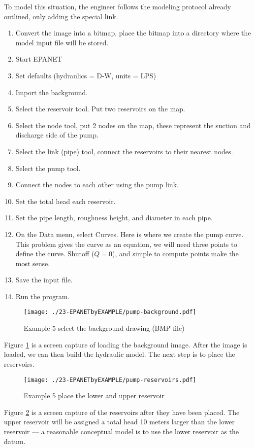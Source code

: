 To model this situation, the engineer follows the modeling protocol already outlined, only adding the special link.
\begin{enumerate}
\item Convert the image into a bitmap, place the bitmap into a directory where the model input file will be stored.
\item Start EPANET
\item Set defaults (hydraulics = D-W,  units = LPS)
\item Import the background.
\item Select the reservoir tool.  Put two reservoirs on the map.
\item Select the node tool, put 2 nodes on the map, these represent the suction and discharge side of the pump.
\item Select the link (pipe) tool, connect the reservoirs to their nearest nodes.  
\item Select the pump tool.
\item Connect the nodes to each other using the pump link.
\item Set the total head each reservoir.
\item Set the pipe length, roughness height, and diameter in each pipe.
\item On the Data menu, select Curves.  Here is where we create the pump curve.   This problem gives the curve as an equation, we will need three points to define the curve.   Shutoff ($Q=0$), and simple to compute points make the most sense.
\item Save the input file.
\item Run the program.   
\end{enumerate}

\begin{figure}[htbp] %
   \centering
   \texttt{[image: ./23-EPANETbyEXAMPLE/pump-background.pdf]} 
   \caption{Example 5 select the background drawing (BMP file)}
   \label{fig:pump-background.pdf}
\end{figure}
Figure \ref{fig:pump-background.pdf} is a screen capture of loading the background image.   After the image is loaded, we can then build the hydraulic model.  The next step is to place the reservoirs.
\clearpage

\begin{figure}[htbp] %
   \centering
   \texttt{[image: ./23-EPANETbyEXAMPLE/pump-reservoirs.pdf]} 
   \caption{Example 5 place the lower and upper reservoir}
   \label{fig:pump-reservoirs.pdf}
\end{figure}
Figure \ref{fig:pump-reservoirs.pdf} is a screen capture of the reservoirs after they have been placed.  The upper reservoir will be assigned a total head 10 meters larger than the lower reservoir --- a reasonable conceptual model is to use the lower reservoir as the datum.
\newpage

